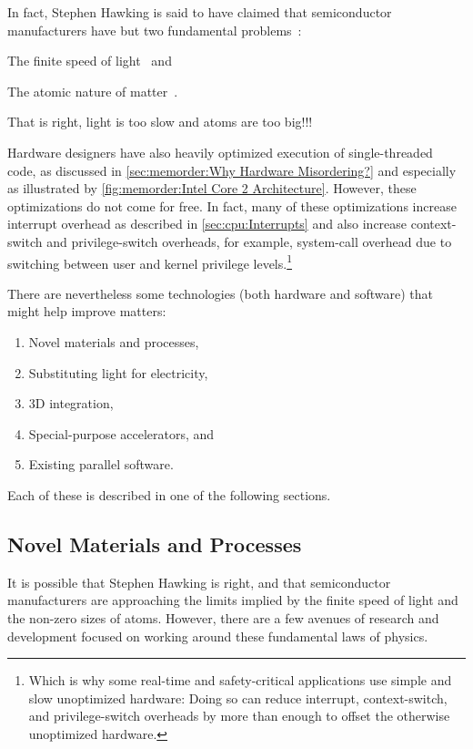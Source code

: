 In fact, Stephen Hawking is said to have claimed that semiconductor
manufacturers have but two fundamental problems~\cite{BryanGardiner2007}:
\begin{enumerate*}[(1)]
\item The finite speed of light~\cite{OleRoemer1671SpeedOfLight} and
\item The atomic nature of matter~\cite{JeanBaptistePerrin1923AtomSize}.
\end{enumerate*}
That is right, light is too slow and atoms are too big!!!

Hardware designers have also heavily optimized execution of
single-threaded code, as discussed in
\cref{sec:memorder:Why Hardware Misordering?}
and especially as illustrated by
\cref{fig:memorder:Intel Core 2 Architecture}.
However, these optimizations do not come for free.
In fact, many of these optimizations increase interrupt overhead as
described in
\cref{sec:cpu:Interrupts}
and also increase context-switch and privilege-switch overheads, for
example, system-call overhead due to switching between user and kernel
privilege
levels.\footnote{
	Which is why some real-time and safety-critical applications
	use simple and slow unoptimized hardware:
	Doing so can reduce interrupt, context-switch, and
	privilege-switch overheads by more than enough to offset the
	otherwise unoptimized hardware.}

There are nevertheless some technologies (both hardware and software)
that might help improve matters:

\begin{enumerate}
\item	Novel materials and processes,
\item	Substituting light for electricity,
\item	3D integration,
\item	Special-purpose accelerators, and
\item	Existing parallel software.
\end{enumerate}

Each of these is described in one of the following sections.

\subsection{Novel Materials and Processes}
\label{sec:cpu:Novel Materials and Processes}

It is possible that Stephen Hawking is right, and that semiconductor
manufacturers are approaching the limits implied by the finite speed of
light and the non-zero sizes of atoms.
However, there are a few avenues of research and development focused on
working around these fundamental laws of physics.

